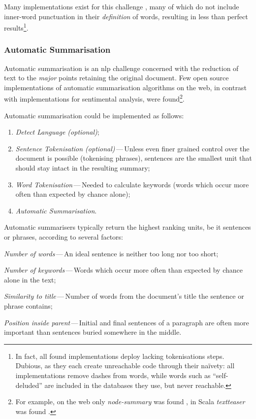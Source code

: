 Many implementations exist for this challenge
  \autocites{thinkroth/sentimental-source-code}{mileszim/sediment-source-code}
  {thisandagain/sentiment-source-code}, many of which do not include
  inner-word punctuation in their \emph{definition} of words, resulting in
  less than perfect results\footnote{In fact, all found implementations
      deploy lacking tokenisations steps.
    Dubious, as they each create unreachable code through their na\"ivety:
      all implementations remove dashes from words, while words such as
      ``self-deluded'' are included in the databases they use, but never
      reachable.}.

\subsubsection{Automatic Summarisation}\label{automatic-summarisation}

Automatic summarisation is an \gls{nlp} challenge concerned with the reduction
  of text to the \emph{major} points retaining the original document.
Few open source implementations of automatic summarisation algorithms on
  the web, in contrast with implementations for sentimental analysis, were
  found\footnote{For example, on the web only \emph{node-summary} was found
    \autocite{jbrooksuk/node-summary-source-code}, in Scala \emph{textteaser}
    was found \autocite{MojoJolo/textteaser-source-code}.}.

Automatic summarisation could be implemented as follows:

\begin{enumerate}
\item\emph{Detect Language (optional)};
\item\emph{Sentence Tokenisation (optional)}\,---\,Unless even finer grained
  control over the document is possible (tokenising phrases), sentences are
  the smallest unit that should stay intact in the resulting summary;
\item\emph{Word Tokenisation}\,---\,Needed to calculate keywords (words
  which occur more often than expected by chance alone);
\item\emph{Automatic Summarisation}.
\end{enumerate}

\noindent Automatic summarisers typically return the highest ranking units,
  be it sentences or phrases, according to several factors:

\begin{aenumerate}
\item\emph{Number of words}\,---\,An ideal sentence is neither too long nor
  too short;
\item\emph{Number of keywords}\,---\,Words which occur more often than
  expected by chance alone in the text;
\item\emph{Similarity to title}\,---\,Number of words from the document's
  title the sentence or phrase contains;
\item\emph{Position inside parent}\,---\,Initial and final sentences of a
  paragraph are often more important than sentences buried somewhere in
  the middle.
\end{aenumerate}

